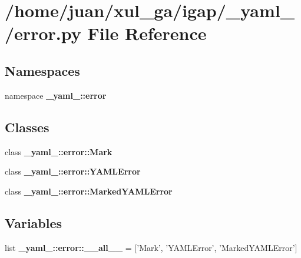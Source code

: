 \section{/home/juan/xul\_\-ga/igap/\_\-yaml\_\-/error.py File Reference}
\label{error_8py}
\subsection*{Namespaces}
\begin{CompactItemize}
\item 
namespace {\bf \_\-yaml\_\-::error}
\end{CompactItemize}
\subsection*{Classes}
\begin{CompactItemize}
\item 
class {\bf \_\-yaml\_\-::error::Mark}
\item 
class {\bf \_\-yaml\_\-::error::YAMLError}
\item 
class {\bf \_\-yaml\_\-::error::MarkedYAMLError}
\end{CompactItemize}
\subsection*{Variables}
\begin{CompactItemize}
\item 
list {\bf \_\-yaml\_\-::error::\_\-\_\-all\_\-\_\-} = ['Mark', 'YAMLError', 'MarkedYAMLError']
\end{CompactItemize}
